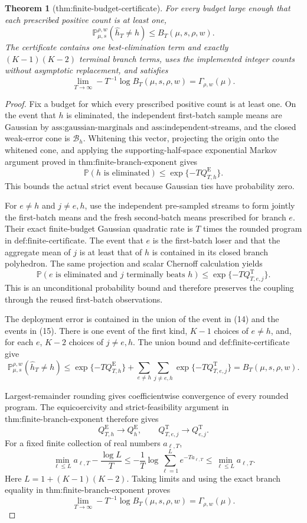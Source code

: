\documentclass{article}
\newtheorem{theorem}{Theorem}
\begin{document}
\begin{theorem}[thm:finite-budget-certificate]\label{thm:finite-budget-certificate}
For every budget large enough that each prescribed positive count is at least one, \[\mathbb P_{\mu,s}^{\rho,w}(\widehat h_T\ne h)\le B_T(\mu,s,\rho,w).\] The certificate contains one best-elimination term and exactly \((K-1)(K-2)\) terminal branch terms, uses the implemented integer counts without asymptotic replacement, and satisfies \[\lim_{T\to\infty}-T^{-1}\log B_T(\mu,s,\rho,w)=\Gamma_{\rho,w}(\mu).\]
\end{theorem}
\begin{proof}
Fix a budget for which every prescribed positive count is at least one. On the event that \(h\) is eliminated, the independent first-batch sample means are Gaussian by \(\text{ass:gaussian-marginals}\) and \(\text{ass:independent-streams}\), and the closed weak-error cone is \(\mathcal B_h\). Whitening this vector, projecting the origin onto the whitened cone, and applying the supporting-half-space exponential Markov argument proved in \(\text{thm:finite-branch-exponent}\) gives
\[
 \mathbb P(h\text{ is eliminated})
 \leq \exp\{-TQ_{T,h}^{\mathrm E}\}. \tag{14}
\]
This bounds the actual strict event because Gaussian ties have probability zero.

For \(e\ne h\) and \(j\ne e,h\), use the independent pre-sampled streams to form jointly the first-batch means and the fresh second-batch means prescribed for branch \(e\). Their exact finite-budget Gaussian quadratic rate is \(T\) times the rounded program in \(\text{def:finite-certificate}\). The event that \(e\) is the first-batch loser and that the aggregate mean of \(j\) is at least that of \(h\) is contained in its closed branch polyhedron. The same projection and scalar Chernoff calculation yields
\[
 \mathbb P(e\text{ is eliminated and }j\text{ terminally beats }h)
 \leq \exp\{-TQ_{T,e,j}^{\mathrm T}\}. \tag{15}
\]
This is an unconditional probability bound and therefore preserves the coupling through the reused first-batch observations.

The deployment error is contained in the union of the event in (14) and the events in (15). There is one event of the first kind, \(K-1\) choices of \(e\ne h\), and, for each \(e\), \(K-2\) choices of \(j\ne e,h\). The union bound and \(\text{def:finite-certificate}\) give
\[
 \mathbb P_{\mu,s}^{\rho,w}(\widehat h_T\ne h)
 \leq \exp\{-TQ_{T,h}^{\mathrm E}\}
 +\sum_{e\ne h}\sum_{j\ne e,h}\exp\{-TQ_{T,e,j}^{\mathrm T}\}
 =B_T(\mu,s,\rho,w).
\]

Largest-remainder rounding gives coefficientwise convergence of every rounded program. The equicoercivity and strict-feasibility argument in \(\text{thm:finite-branch-exponent}\) therefore gives
\[
 Q_{T,h}^{\mathrm E}\longrightarrow Q_h^{\mathrm E},
 \qquad
 Q_{T,e,j}^{\mathrm T}\longrightarrow Q_{e,j}^{\mathrm T}.
\]
For a fixed finite collection of real numbers \(a_{\ell,T}\),
\[
 \min_{\ell\leq L}a_{\ell,T}-\frac{\log L}{T}
 \leq -\frac1T\log\sum_{\ell=1}^L e^{-Ta_{\ell,T}}
 \leq \min_{\ell\leq L}a_{\ell,T}.
\]
Here \(L=1+(K-1)(K-2)\). Taking limits and using the exact branch equality in \(\text{thm:finite-branch-exponent}\) proves
\[
 \lim_{T\to\infty}-T^{-1}\log B_T(\mu,s,\rho,w)
 =\Gamma_{\rho,w}(\mu).
\]
\end{proof}
\end{document}
